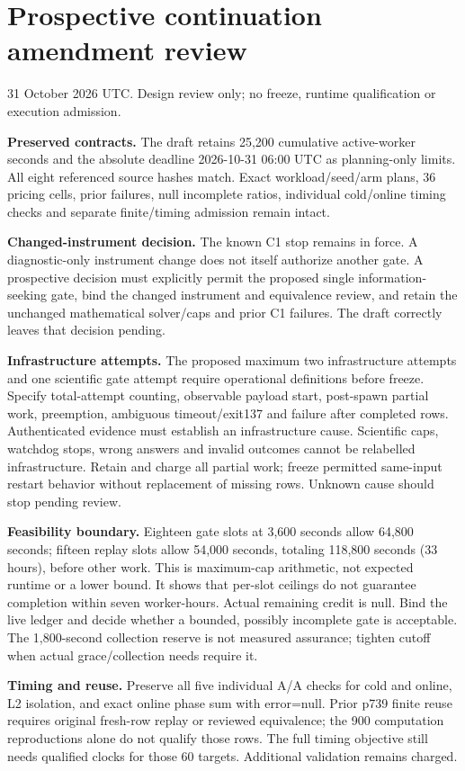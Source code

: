 \documentclass[11pt]{article}
\begin{document}
\section*{Prospective continuation amendment review}
31 October 2026 UTC. Design review only; no freeze, runtime qualification or execution admission.

\textbf{Preserved contracts.} The draft retains 25,200 cumulative active-worker seconds and the absolute deadline 2026-10-31 06:00 UTC as planning-only limits. All eight referenced source hashes match. Exact workload/seed/arm plans, 36 pricing cells, prior failures, null incomplete ratios, individual cold/online timing checks and separate finite/timing admission remain intact.

\textbf{Changed-instrument decision.} The known C1 stop remains in force. A diagnostic-only instrument change does not itself authorize another gate. A prospective decision must explicitly permit the proposed single information-seeking gate, bind the changed instrument and equivalence review, and retain the unchanged mathematical solver/caps and prior C1 failures. The draft correctly leaves that decision pending.

\textbf{Infrastructure attempts.} The proposed maximum two infrastructure attempts and one scientific gate attempt require operational definitions before freeze. Specify total-attempt counting, observable payload start, post-spawn partial work, preemption, ambiguous timeout/exit137 and failure after completed rows. Authenticated evidence must establish an infrastructure cause. Scientific caps, watchdog stops, wrong answers and invalid outcomes cannot be relabelled infrastructure. Retain and charge all partial work; freeze permitted same-input restart behavior without replacement of missing rows. Unknown cause should stop pending review.

\textbf{Feasibility boundary.} Eighteen gate slots at 3,600 seconds allow 64,800 seconds; fifteen replay slots allow 54,000 seconds, totaling 118,800 seconds (33 hours), before other work. This is maximum-cap arithmetic, not expected runtime or a lower bound. It shows that per-slot ceilings do not guarantee completion within seven worker-hours. Actual remaining credit is null. Bind the live ledger and decide whether a bounded, possibly incomplete gate is acceptable. The 1,800-second collection reserve is not measured assurance; tighten cutoff when actual grace/collection needs require it.

\textbf{Timing and reuse.} Preserve all five individual A/A checks for cold and online, L2 isolation, and exact online phase sum with error=null. Prior p739 finite reuse requires original fresh-row replay or reviewed equivalence; the 900 computation reproductions alone do not qualify those rows. The full timing objective still needs qualified clocks for those 60 targets. Additional validation remains charged.
\end{document}
